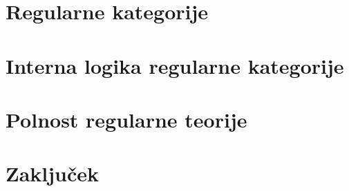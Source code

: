 \documentclass[12pt,a4paper]{book}
\theoremstyle{definition}
\theoremstyle{plain}
\theoremstyle{definition}
\theoremstyle{remark}
\begin{document}
\section{Regularne kategorije}
%
\section{Interna logika regularne kategorije}
%
\section{Polnost regularne teorije}
%
\section{Zaključek}
%
\end{document}
